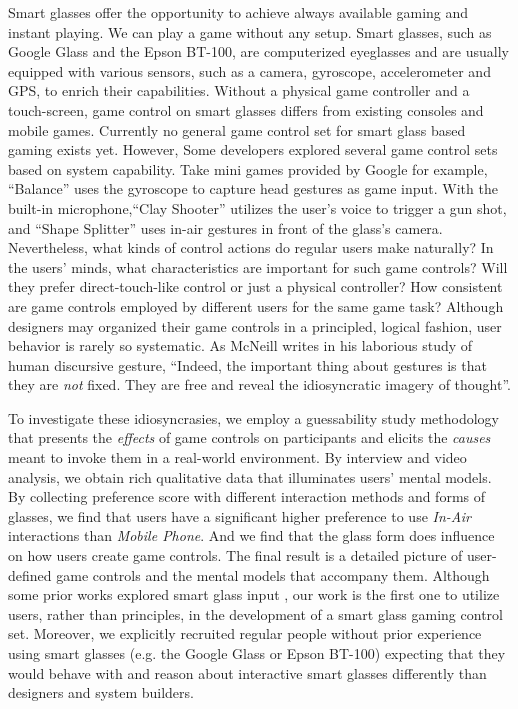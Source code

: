 \documentclass{sigchi}
\begin{document}
Smart glasses offer the opportunity to achieve always available gaming and instant playing. We can play a game without any setup. Smart glasses, such as Google Glass and the Epson BT-100, are computerized eyeglasses and are usually equipped with various sensors, such as a camera, gyroscope, accelerometer and GPS, to enrich their capabilities. 
Without a physical game controller and a touch-screen, game control on smart glasses differs from existing consoles and mobile games. Currently no general game control set for smart glass based gaming exists yet. However, Some developers explored several game control sets based on system capability. Take mini games \cite{MiniGames} provided by Google for example, ``Balance'' uses the gyroscope to capture head gestures as game input. With the built-in microphone,``Clay Shooter'' utilizes the user's voice to trigger a gun shot, and ``Shape Splitter'' uses in-air gestures in front of the glass's camera.  
Nevertheless, what kinds of control actions do regular users make naturally? In the users' minds, what characteristics are important for such game controls? Will they prefer direct-touch-like control or just a physical controller? How consistent are game controls employed by different users for the same game task? 
Although designers may organized their game controls in a principled, logical fashion, user behavior is rarely so systematic. As McNeill \cite{HandAndMind} writes in his laborious study of human discursive gesture, ``Indeed, the important thing about gestures is that they are \emph{not} fixed. They are free and reveal the idiosyncratic imagery of thought''.


To investigate these idiosyncrasies, we employ a guessability study methodology \cite{Wobbrock:2005:MGS:1056808.1057043} that presents the \emph{effects} of game controls on participants and elicits the \emph{causes} meant to invoke them in a real-world environment. By interview and video analysis, we obtain rich qualitative data that illuminates users' mental models. By collecting preference score with different interaction methods and forms of glasses, 
we find that users have a significant higher preference to use \emph{In-Air} interactions than \emph{Mobile Phone}.
 And we find that the glass form does influence on how users create game controls. The final result is a detailed picture of user-defined game controls and the mental models that accompany them. Although some prior works explored smart glass input \cite{Colaco:2013:MCL:2501988.2502042,Serrano:2014:EUH:2611247.2556984}, our work is the first one to utilize users, rather than principles, in the development of a smart glass gaming control set. Moreover, we explicitly recruited regular people without prior experience using smart glasses (e.g. the Google Glass or Epson BT-100) expecting that they would behave with and reason about interactive smart glasses differently than designers and system builders.
\end{document}
